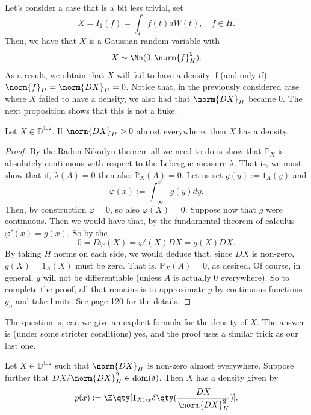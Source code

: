 \documentclass[
    a4paper,
    DIV=14,
    abstract=true,
    numbers=noenddot
]{scrartcl}
\begin{document}
	Let's consider a case that is a bit less trivial, set  $$X=I_1(f)= \int_{I}f(t) dW(t),\quad f \in H.$$  Then, we have that $X$ is a Gaussian random variable with  $$X\sim \Nn(0,\norm{f}^2_{H}).$$ As a result, we obtain that $X$  will fail to have a density if (and only if) $\norm{f}_{H}=\norm{DX}_{H}=0$. Notice that, in the previously considered case where $X$ failed to have a density, we also had that $\norm{DX}_{H}$ became $0$.  The next proposition shows that this is not a fluke.
	\begin{theorem}
		Let $X\in \mathbb{D}^{1,2}$. If $\norm{DX}_{H}>0$ almost everywhere, then $X$ has a density.
	\end{theorem}
	\begin{proof}
		By the \href{https://en.wikipedia.org/wiki/Radon%E2%80%93Nikodym_theorem}{Radon Nikodyn theorem}  all we need to do is show that $\mathbb{P}_X$ is absolutely continuous with respect to the Lebesgue measure $\lambda$. That is, we must show that if, $\lambda (A)=0$ then also $\mathbb{P}_X(A)=0$. Let us set $g(y):=1_A(y)$ and
		\begin{equation*}
			\varphi(x):=\int_{-\infty}^x g(y)dy.
		\end{equation*}
		Then, by construction $\varphi=0$, so also $\varphi(X)=0$. Suppose now that $g$ were continuous. Then we would have that, by the fundamental theorem of calculus $\varphi'(x)=g(x)$. So by the 
		\begin{equation*}
			0=D \varphi(X)=\varphi'(X)DX=g(X)DX.
		\end{equation*}
		By taking $H$ norms on each side, we would deduce that, since $DX$ is non-zero, $g(X)=1_A(X)$ must be zero. That is, $\mathbb{P}_X(A)=0$, as desired. Of course, in general, $g$ will not be differentiable (unless $A$ is actually  $0$ everywhere). So to complete the proof, all that remains is to approximate $g$ by continuous functions $g_n$ and take limits. See \cite{nualart2018introduction} page 120 for the details.
	\end{proof}
	The question is, can we give an explicit formula for the density of $X$. The answer is (under some stricter conditions) yes, and the proof uses a similar trick as our last one.
	\begin{theorem}\label{dens exists}
		Let $X\in \mathbb{D}^{1,2}$ such that $\norm{DX}_{H}$ is non-zero almost everywhere. Suppose further that $DX/\norm{DX}^2_{H}\in \text{dom} (\delta )$. Then $X$ has a density given by
		\begin{equation*}
			p(x):=\E\qty[1_{X> x}\delta \qty(\frac{DX}{\norm{DX}_{H}^2}) ].
		\end{equation*}
	\end{theorem}
\end{document}
